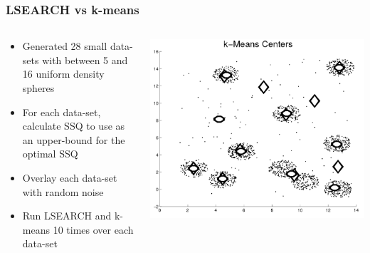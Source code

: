 \documentclass{beamer}
\begin{document}
\frame
{
  \frametitle{LSEARCH vs k-means}
  
  \begin{columns}
  
    \begin{column}{0.5\textwidth}
       \begin{itemize}
          \item{Generated 28 small data-sets with between 5 and 16 uniform density spheres}
          \item{For each data-set, calculate SSQ to use as an upper-bound for the optimal SSQ}
          \item{Overlay each data-set with random noise}
          \item{Run LSEARCH and k-means 10 times over each data-set}
      \end{itemize}
    \end{column}
    
    \begin{column}{0.5\textwidth}
        \begin{center}
         \includegraphics[width=\textwidth]{figures/k-means_clusters.png}      
        \end{center}
    \end{column}
    
  \end{columns}  
}
\end{document}
